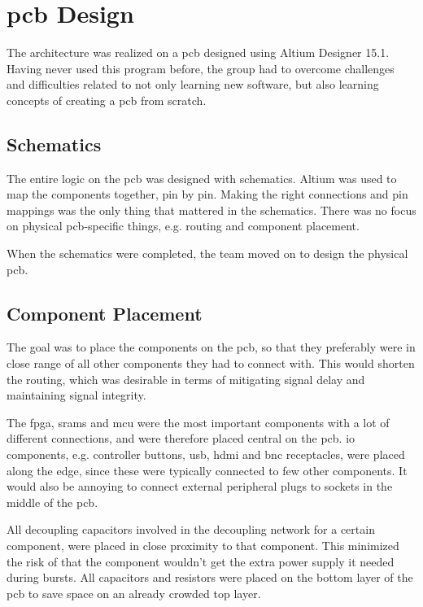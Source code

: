 \section{\gls{pcb} Design}
The architecture was realized on a \gls{pcb} designed using Altium Designer 15.1.
Having never used this program before, the group had to overcome challenges and difficulties related to not only learning new software, but also learning concepts of creating a \gls{pcb} from scratch.

\subsection{Schematics}
The entire logic on the \gls{pcb} was designed with schematics.
Altium was used to map the components together, pin by pin.
Making the right connections and pin mappings was the only thing that mattered in the schematics.
There was no focus on physical \gls{pcb}-specific things, e.g. routing and component placement.

When the schematics were completed, the team moved on to design the physical \gls{pcb}.

\subsection{Component Placement}
The goal was to place the components on the \gls{pcb}, so that they preferably were in close range of all other components they had to connect with.
This would shorten the routing, which was desirable in terms of mitigating signal delay and maintaining signal integrity.

The \gls{fpga}, \gls{sram}s and \gls{mcu} were the most important components with a lot of different connections, and were therefore placed central on the \gls{pcb}.
\gls{io} components, e.g. controller buttons, \gls{usb}, \gls{hdmi} and \gls{bnc} receptacles, were placed along the edge, since these were typically connected to few other components.
It would also be annoying to connect external peripheral plugs to sockets in the middle of the \gls{pcb}.

All decoupling capacitors involved in the decoupling network for a certain component, were placed in close proximity to that component.
This minimized the risk of that the component wouldn't get the extra power supply it needed during bursts.
All capacitors and resistors were placed on the bottom layer of the \gls{pcb} to save space on an already crowded top layer.

